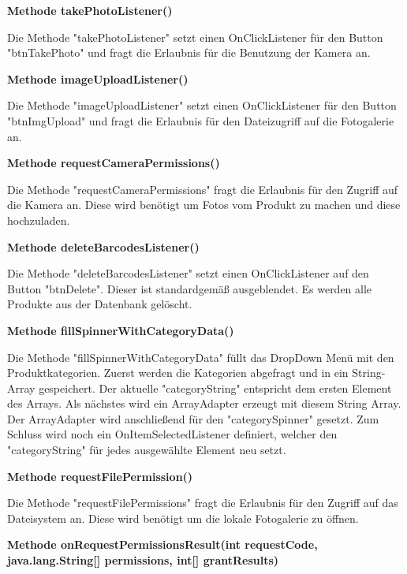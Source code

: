 \documentclass{scrartcl}
\begin{document}
\noindent\textbf{Methode takePhotoListener()} 

\noindent Die Methode "takePhotoListener" setzt einen OnClickListener für den Button "btnTakePhoto" und fragt die Erlaubnis für die Benutzung der Kamera an. \newline

\noindent\textbf{Methode imageUploadListener()} 

\noindent Die Methode "imageUploadListener" setzt einen OnClickListener für den Button "btnImgUpload" und fragt die Erlaubnis für den Dateizugriff auf die Fotogalerie an. \newline

\noindent\textbf{Methode requestCameraPermissions()} 

\noindent Die Methode "requestCameraPermissions" fragt die Erlaubnis für den Zugriff auf die Kamera an. Diese wird benötigt um Fotos vom Produkt zu machen und diese hochzuladen. \newline

\noindent\textbf{Methode deleteBarcodesListener()} 

\noindent Die Methode "deleteBarcodesListener" setzt einen OnClickListener auf den Button "btnDelete". Dieser ist standardgemäß ausgeblendet. Es werden alle Produkte aus der Datenbank gelöscht. \newline 

\noindent\textbf{Methode fillSpinnerWithCategoryData()} 

\noindent Die Methode "fillSpinnerWithCategoryData" füllt das DropDown Menü mit den Produktkategorien. Zuerst werden die Kategorien abgefragt und in ein String-Array gespeichert. Der aktuelle "categoryString" entspricht dem ersten Element des Arrays. Als nächstes wird ein ArrayAdapter erzeugt mit diesem String Array. Der ArrayAdapter wird anschließend für den "categorySpinner" gesetzt. Zum Schluss wird noch ein OnItemSelectedListener definiert, welcher den "categoryString" für jedes ausgewählte Element neu setzt. \newline

\noindent\textbf{Methode requestFilePermission()} 

\noindent Die Methode "requestFilePermissions" fragt die Erlaubnis für den Zugriff auf das Dateisystem an. Diese wird benötigt um die lokale Fotogalerie zu öffnen. \newline

\noindent\textbf{Methode onRequestPermissionsResult(int requestCode, \newline           java.lang.String[] permissions, int[] grantResults)} 
\end{document}
